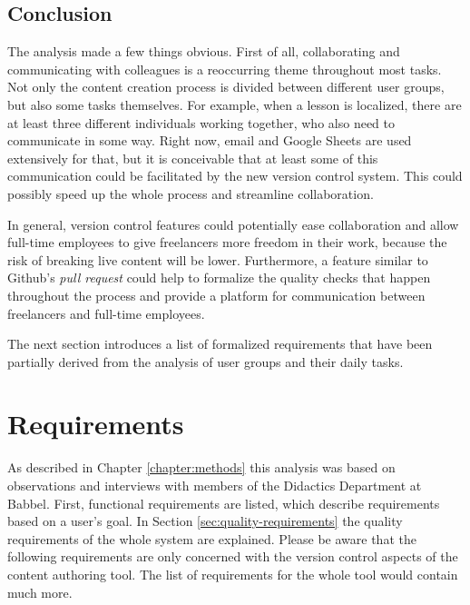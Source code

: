 \subsection{Conclusion}
The analysis made a few things obvious. First of all, collaborating and communicating with colleagues is a reoccurring theme throughout most tasks. Not only the content creation process is divided between different user groups, but also some tasks themselves. For example, when a lesson is localized, there are at least three different individuals working together, who also need to communicate in some way. Right now, email and Google Sheets are used extensively for that, but it is conceivable that at least some of this communication could be facilitated by the new version control system. This could possibly speed up the whole process and streamline collaboration.


In general, version control features could potentially ease collaboration and allow full-time employees to give freelancers more freedom in their work, because the risk of breaking live content will be lower. Furthermore, a feature similar to Github's \textit{pull request} could help to formalize the quality checks that happen throughout the process and provide a platform for communication between freelancers and full-time employees.

The next section introduces a list of formalized requirements that have been partially derived from the analysis of user groups and their daily tasks.

\section{Requirements}
As described in Chapter \ref{chapter:methods} this analysis was based on observations and interviews with members of the Didactics Department at Babbel. First, functional requirements are listed, which describe requirements based on a user's goal. In Section \ref{sec:quality-requirements} the quality requirements of the whole system are explained.
Please be aware that the following requirements are only concerned with the version control aspects of the content authoring tool. The list of requirements for the whole tool would contain much more.

